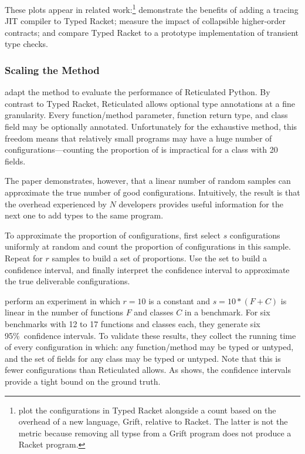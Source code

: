These plots appear in related work:\footnote{\citet{kat-pldi-2019} plot the
  configurations in Typed Racket alongside a count based on
 the overhead of a new language, Grift, relative to Racket.
 The latter is not the  metric because removing all typse from
 a Grift program does not produce a Racket program.}
\citet{bbst-oopsla-2017} demonstrate the benefits of adding a tracing JIT compiler to Typed Racket;
\citet{fgsfs-oopsla-2018} measure the impact of collapsible higher-order contracts; and
\citet{gf-icfp-2018} compare Typed Racket to a prototype implementation of transient type checks.


\subsubsection{Scaling the Method}

\citet{gm-pepm-2018} adapt the method to evaluate the performance of Reticulated
 Python.
By contrast to Typed Racket, Reticulated allows optional type annotations at
 a fine granularity.
Every function/method parameter, function return type, and class field may
 be optionally annotated.
Unfortunately for the exhaustive method, this freedom means that relatively
 small programs may have a huge number of configurations---counting
 the proportion of  is impractical for a class with 20 fields.

The paper demonstrates, however, that a linear number of random samples can
 approximate the true number of good configurations.
Intuitively, the result is that the overhead experienced by $N$ developers
 provides useful information for the next one to add types to the same program.

To approximate the proportion of  configurations,
 first select $s$ configurations uniformly at random and count the
 proportion of  configurations in this sample.
Repeat for $r$ samples to build a set of proportions.
Use the set to build a confidence interval, and finally interpret the
 confidence interval to approximate the true deliverable configurations.

\citet{gm-pepm-2018} perform an experiment in which $r=10$ is a constant
 and $s = 10 * (F + C)$ is linear in the number of functions $F$ and classes
 $C$ in a benchmark.
For six benchmarks with 12 to 17 functions and classes each,
 they generate six 95\%~confidence intervals.
To validate these results, they collect the running time of every configuration
 in which: any function/method may be typed or untyped, and the set of fields
 for any class may be typed or untyped.
Note that this is fewer configurations than Reticulated allows.
As  shows, the confidence intervals provide a tight
 bound on the ground truth.

